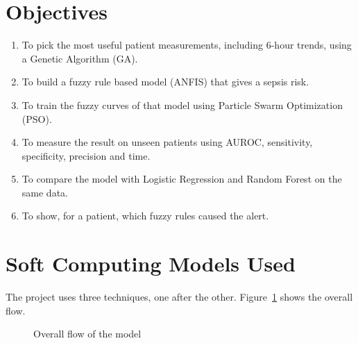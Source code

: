 \documentclass[11pt,a4paper]{article}
\begin{document}
\section{Objectives}
\begin{enumerate}[nosep]
\item To pick the most useful patient measurements, including 6-hour trends, using a Genetic Algorithm (GA).
\item To build a fuzzy rule based model (ANFIS) that gives a sepsis risk.
\item To train the fuzzy curves of that model using Particle Swarm Optimization (PSO).
\item To measure the result on unseen patients using AUROC, sensitivity, specificity, precision and time.
\item To compare the model with Logistic Regression and Random Forest on the same data.
\item To show, for a patient, which fuzzy rules caused the alert.
\end{enumerate}

\section{Soft Computing Models Used}
The project uses three techniques, one after the other. Figure~\ref{fig:flow} shows the overall flow.

\begin{figure}[H]
\centering
{}
\caption{Overall flow of the model}\label{fig:flow}
\end{figure}
\end{document}
